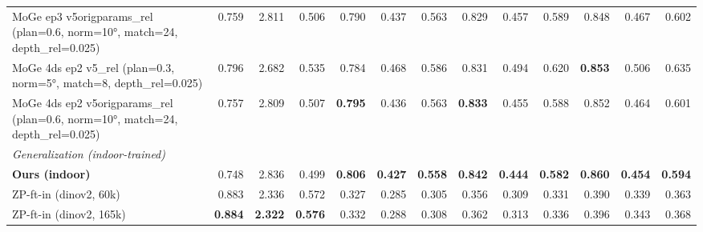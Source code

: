 \documentclass[10pt]{article}
\begin{document}
\begin{table}[t]
{\begin{tabular}{l r r r r r r r r r r r r}
MoGe ep3 v5origparams\_rel (plan=0.6, norm=10°, match=24, depth\_rel=0.025) & 0.759 & 2.811 & 0.506 & 0.790 & 0.437 & 0.563 & 0.829 & 0.457 & 0.589 & 0.848 & 0.467 & 0.602 \\
MoGe 4ds ep2 v5\_rel (plan=0.3, norm=5°, match=8, depth\_rel=0.025) & 0.796 & 2.682 & 0.535 & 0.784 & 0.468 & 0.586 & 0.831 & 0.494 & 0.620 & \textbf{0.853} & 0.506 & 0.635 \\
MoGe 4ds ep2 v5origparams\_rel (plan=0.6, norm=10°, match=24, depth\_rel=0.025) & 0.757 & 2.809 & 0.507 & \textbf{0.795} & 0.436 & 0.563 & \textbf{0.833} & 0.455 & 0.588 & 0.852 & 0.464 & 0.601 \\
\midrule
\multicolumn{13}{l}{\textit{Generalization (indoor-trained)}} \\
\textbf{Ours (indoor)} & 0.748 & 2.836 & 0.499 & \textbf{0.806} & \textbf{0.427} & \textbf{0.558} & \textbf{0.842} & \textbf{0.444} & \textbf{0.582} & \textbf{0.860} & \textbf{0.454} & \textbf{0.594} \\
ZP-ft-in (dinov2, 60k) & 0.883 & 2.336 & 0.572 & 0.327 & 0.285 & 0.305 & 0.356 & 0.309 & 0.331 & 0.390 & 0.339 & 0.363 \\
ZP-ft-in (dinov2, 165k) & \textbf{0.884} & \textbf{2.322} & \textbf{0.576} & 0.332 & 0.288 & 0.308 & 0.362 & 0.313 & 0.336 & 0.396 & 0.343 & 0.368 \\
\bottomrule
\end{tabular}%
}
\end{table}

\clearpage
\end{document}
